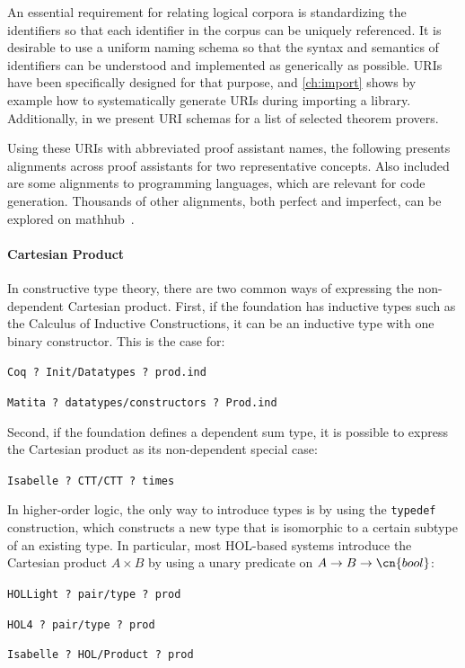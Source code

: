 An essential requirement for relating logical corpora is standardizing the identifiers so that each identifier in the corpus can be uniquely referenced.
It is desirable to use a uniform naming schema so that the syntax and semantics of identifiers can be understood and implemented as generically as possible.
\mmt URIs have been specifically designed for that purpose, and \autoref{ch:import} shows by example how to systematically generate URIs during importing a library. Additionally, in \cite{MueGauKal:alignmentsreport17} we present URI schemas for a list of selected theorem provers. 

Using these URIs with abbreviated proof assistant
names, the following presents alignments across proof assistants for two representative
concepts.  Also included are some alignments to programming languages, which are relevant
for code generation. Thousands of other alignments, both perfect and imperfect, can be
explored on mathhub~\cite{Alignments:on}.

\paragraph{Cartesian Product}

In constructive type theory, there are two common ways of expressing the non-dependent Cartesian product.
First, if the foundation has inductive types such as the Calculus of Inductive Constructions, it can be an inductive type with one binary constructor. This is the case for:
\begin{compactitem}
\item \texttt{Coq ? Init/Datatypes ? prod.ind}
\item \texttt{Matita ? datatypes/constructors ? Prod.ind}
\end{compactitem}
Second, if the foundation defines a dependent sum type, it is possible to express the Cartesian product as its non-dependent special case:
\begin{compactitem}
\item \texttt{Isabelle ? CTT/CTT ? times}
\end{compactitem}

In higher-order logic, the only way to introduce types is by using the \texttt{typedef} construction, which constructs a new type that is isomorphic to a certain subtype of an existing type.
In particular, most HOL-based systems introduce the Cartesian product $A\times B$ by using a unary predicate on $A\to B\to\cn{bool}$:
\begin{compactitem}
\item \texttt{HOLLight ? pair/type ? prod}
\item \texttt{HOL4 ? pair/type ? prod}
\item \texttt{Isabelle ? HOL/Product ? prod}
\end{compactitem}


